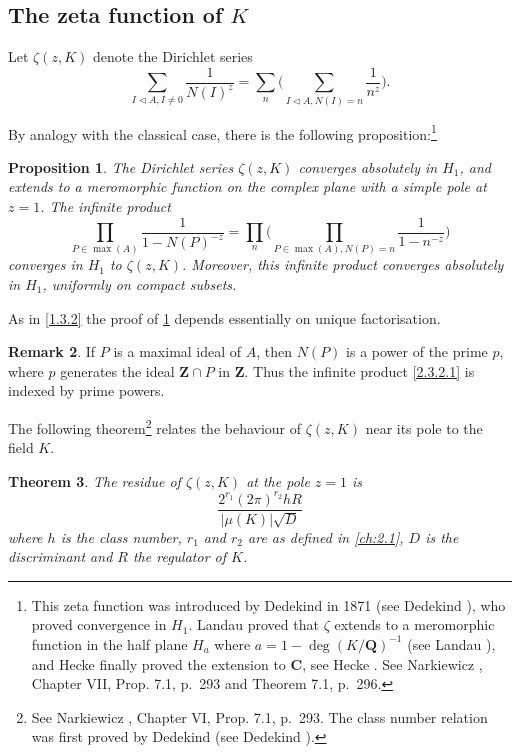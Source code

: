 \documentclass[10pt,leqno]{article}
\newtheorem{theo}{Theorem}[subsection]
\newtheorem{prop}[theo]{Proposition}
\theoremstyle{definition}
\newtheorem{rema}[theo]{Remark}
\def\ZZ{\mathbf{Z}}
\def\QQ{\mathbf{Q}}
\def\CC{\mathbf{C}}
\newcommand{\tri}{\mathbin{\triangleleft}}
\def\fnonse{This zeta function was introduced by Dedekind in 1871 (see Dedekind \cite{bib:37}), who proved convergence in $H_1$. Landau proved that $\zeta$ extends to a meromorphic function in the half plane $H_a$ where $a = 1 - \deg(K / \QQ)^{-1}$ (see Landau \cite{bib:116}), and Hecke finally proved the extension to $\CC$, see Hecke \cite{bib:94}. See Narkiewicz \cite{bib:146}, Chapter VII, Prop. 7.1, p.~293 and Theorem 7.1, p.~296.}
\def\fnonei{See Narkiewicz \cite{bib:146}, Chapter VI, Prop. 7.1, p.~293. The class number relation was first proved by Dedekind (see Dedekind \cite{bib:37}).}
\begin{document}
\subsection[The zeta function of K]{The zeta function of $K$}
\label{ch:2.3}

Let $\zeta(z,K)$ denote the Dirichlet series
\begin{equation}
\label{2.3.1}
\sum_{I \tri A, I\not=0} \frac{1}{N(I)^z}
= \sum_n \biggl(
\sum_{I \tri A, N(I)=n} \frac{1}{n^z}
\biggr).
\end{equation}

By analogy with the classical case, there is the following proposition:\footnote{\fnonse}


\begin{prop}
\label{2.3.2}
The Dirichlet series $\zeta(z,K)$ converges absolutely in $H_1$, and extends to a meromorphic function on the complex plane with a simple pole at $z = 1$.
The infinite product
\begin{equation}
\label{2.3.2.1}
\prod_{P \in \max(A)} \frac{1}{1 - N(P)^{-z}}
= \prod_n\biggl(
\prod_{P \in \max(A), N(P)=n} \frac{1}{1-n^{-z}}
\biggr)
\end{equation}
converges in $H_1$ to $\zeta(z,K)$.
Moreover, this infinite product converges absolutely in $H_1$, uniformly on compact subsets.
\end{prop}


As in \ref{1.3.2} the proof of \ref{2.3.2} depends essentially on unique factorisation.


\begin{rema}
\label{2.3.3}
If $P$ is a maximal ideal of $A$, then $N(P)$ is a power of the prime $p$, where $p$ generates the ideal $\ZZ \cap P$ in $\ZZ$.
Thus the infinite product \eqref{2.3.2.1} is indexed by prime powers.
\end{rema}

The following theorem\footnote{\fnonei} relates the behaviour of $\zeta(z,K)$ near its pole to the field $K$.


\begin{theo}
\label{2.3.4}
The residue of $\zeta(z,K)$ at the pole $z = 1$ is
\begin{equation}
\label{2.3.4.1}
\frac{2^{r_1} (2\pi)^{r_2} h R}{|\mu(K)| \sqrt D}
\end{equation}
where $h$ is the class number, $r_1$ and $r_2$ are as defined in \ref{ch:2.1}, $D$ is the discriminant and $R$ the regulator of $K$.
\end{theo}
\end{document}
